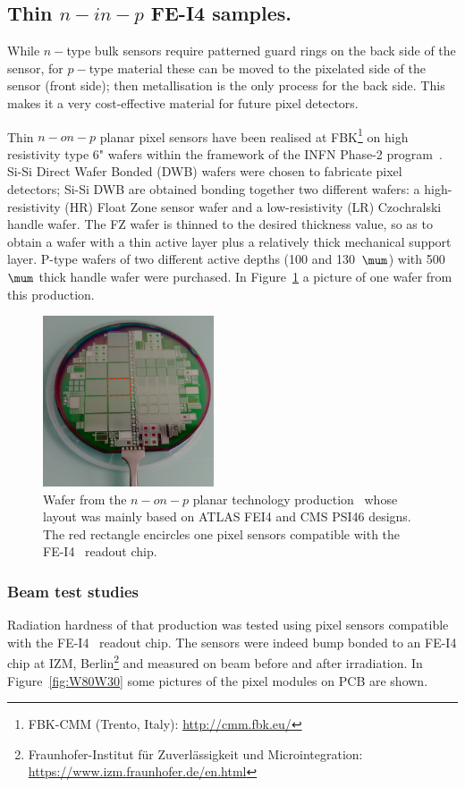 \subsection{Thin $n-in-p$ FE-I4 samples.}

While $n-$type bulk sensors require patterned guard rings on the back side of the sensor, for $p-$type material these can be moved to the pixelated side of the sensor (front side); then metallisation is the only process for the back side. This makes it a very cost-effective material for future pixel detectors. 

Thin $n-on-p$ planar pixel sensors have been realised at FBK\footnote{FBK-CMM (Trento, Italy): \url{http://cmm.fbk.eu/}} on high resistivity type 6" 
wafers within 
the  framework of the INFN Phase-2 program~\cite{DALLABETTA2016388}.
Si-Si Direct Wafer Bonded (DWB) wafers were chosen to fabricate pixel detectors;  Si-Si DWB  are obtained bonding together two different wafers: a high-resistivity (HR) Float Zone sensor wafer and a low-resistivity (LR) Czochralski handle wafer. The FZ wafer is thinned to the desired thickness value, so as to obtain a wafer with a thin active layer plus a relatively thick mechanical support layer. P-type wafers of two different active depths (100 and 130~$\mum$) with 500~$\mum$  thick handle wafer were purchased. 
In Figure~\ref{fig:wafer.png} a picture of one wafer from this production.
\begin{figure}[!htpb]
\centering
\includegraphics[width=0.45\textwidth]{wafer.png}
\caption{\label{fig:wafer.png} Wafer from the $n-on-p$ planar technology production~\cite{DALLABETTA2016388}  whose layout was mainly based on ATLAS FEI4 and CMS PSI46 designs. The red rectangle 
encircles one pixel sensors compatible with the FE-I4~\cite{FEI4} 
readout chip.}
\end{figure}

\subsubsection{Beam test studies}
Radiation hardness of that production was tested  using pixel sensors compatible with the FE-I4~\cite{FEI4} 
readout chip. The sensors were indeed bump bonded to an FE-I4 chip at IZM, 
Berlin\footnote{Fraunhofer-Institut f\"ur Zuverl\"assigkeit und Microintegration: \url{https://www.izm.fraunhofer.de/en.html}} and measured 
on beam before and after irradiation. In Figure~\ref{fig:W80W30} some pictures of the pixel modules on 
PCB are shown. 

